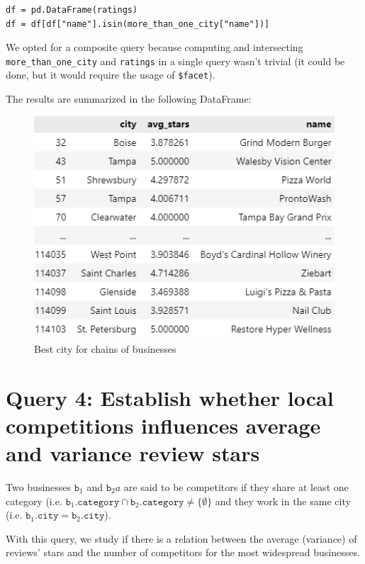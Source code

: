 \documentclass{Configuration_Files/PoliMi3i_thesis}
\begin{document}
\bigskip 

\begin{verbatim}
df = pd.DataFrame(ratings)
df = df[df["name"].isin(more_than_one_city["name"])]
\end{verbatim}

\bigskip

We opted for a composite query because computing and intersecting \texttt{more\_than\_one\_city} and \texttt{ratings} in a single query wasn't trivial (it could be done, but it would require the usage of \texttt{\$facet}).

The results are summarized in the following DataFrame:
\bigskip

\begin{figure}[H]
    \centering
    \includegraphics[width=2\columnwidth / 3]{imgs/query_4_table.png}
    \caption{Best city for chains of businesses}
    \label{fig:query_4}
\end{figure}

\bigskip

\section{Query 4: Establish whether local competitions influences average and variance review stars}
Two businesses $\texttt{b}_1$ and $\texttt{b}_2a$ are said to be competitors if they share at least one category (i.e. $\texttt{b}_1\texttt{.category} \cap \texttt{b}_2\texttt{.category} \neq \{\emptyset\}$ and they work in the same city (i.e. $\texttt{b}_1\texttt{.city} = \texttt{b}_2\texttt{.city}$). 

With this query, we study if there is a relation between the average (variance) of reviews' stars and the number of competitors for the most widespread businesses. 
\end{document}
